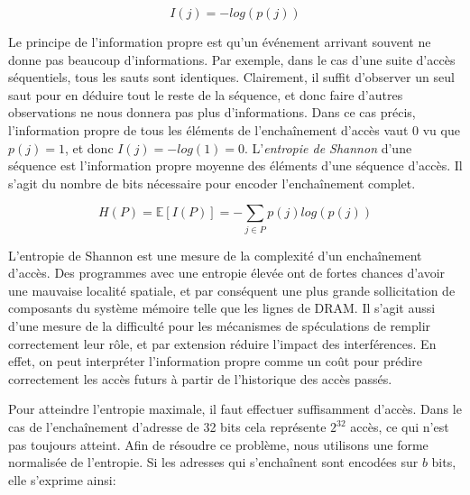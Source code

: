 \begin{equation}
\label{equation:self_information}
I(j) = -log(p(j))
\end{equation}

Le principe de l'information propre est qu'un événement arrivant souvent ne donne pas beaucoup d'informations.
Par exemple, dans le cas d'une suite d'accès séquentiels, tous les sauts sont identiques.
Clairement, il suffit d'observer un seul saut pour en déduire tout le reste de la séquence, et donc faire d'autres observations ne nous donnera pas plus d'informations.
Dans ce cas précis, l'information propre de tous les éléments de l'enchaînement d'accès vaut 0 vu que $p(j) = 1$, et donc $I(j) = -log(1) = 0$.
L'\emph{entropie de Shannon} d'une séquence est l'information propre moyenne des éléments d'une séquence d'accès.
Il s'agit du nombre de bits nécessaire pour encoder l'enchaînement complet.

\begin{equation}
\label{equation:shannon}
H(P) = \mathbb{E}[I(P)] = -\sum_{j \in P}p(j)log(p(j))
\end{equation}

L'entropie de Shannon est une mesure de la complexité d'un enchaînement d'accès.
Des programmes avec une entropie élevée ont de fortes chances d'avoir une mauvaise localité spatiale, et par conséquent une plus grande sollicitation de composants du système mémoire telle que les lignes de DRAM.
Il s'agit aussi d'une mesure de la difficulté pour les mécanismes de spéculations de remplir correctement leur rôle, et par extension réduire l'impact des interférences.
En effet, on peut interpréter l'information propre comme un coût pour prédire correctement les accès futurs à partir de l'historique des accès passés.

Pour atteindre l'entropie maximale, il faut effectuer suffisamment d'accès.
Dans le cas de l'enchaînement d'adresse de 32 bits cela représente $2^32$ accès, ce qui n'est pas toujours atteint.
Afin de résoudre ce problème, nous utilisons une forme normalisée de l'entropie.
Si les adresses qui s'enchaînent sont encodées sur $b$ bits, elle s'exprime ainsi:

